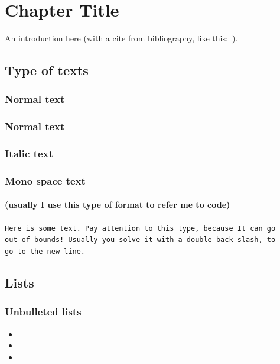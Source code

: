 
\chapter{Chapter Title}

An introduction here (with a cite from bibliography, like this:~\cite{greenwade93}).
\section{Type of texts}
\subsection{Normal text}
\lipsum[1]

\subsection{Normal text}
\textbf{\lipsum[1]}

\subsection{Italic text}
\textit{\lipsum[1]}

\subsection{Mono space text}
\subsubsection{(usually I use this type of format to refer me to code)}
\texttt{Here is some text. Pay attention to this type, because It can go 
\\ out of bounds! Usually you solve it with a double back-slash, to 
\\ go to the new line.}

\section{Lists}
\subsection{Unbulleted lists}
\begin{itemize}
    \item \lipsum[1]
    \item \lipsum[1]
    \item \lipsum[1]
\end{itemize}

